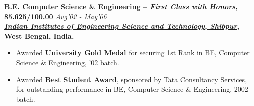 \documentclass[9pt]{article}
\newenvironment{changemargin}[2]{%
  \begin{list}{}{%
    \setlength{\topsep}{0pt}%
    \setlength{\leftmargin}{#1}%
    \setlength{\rightmargin}{#2}%
    \setlength{\listparindent}{\parindent}%
    \setlength{\itemindent}{\parindent}%
    \setlength{\parsep}{\parskip}%
  }%
  \item[]}{\end{list}
}
\newenvironment{body} {
	\vspace*{-16pt}
	\begin{changemargin}{-0.25in}{-0.5in}
  }	
	{\end{changemargin}
}
\begin{document}
\begin{body}
  \medskip
	\textbf{B.E. Computer Science \& Engineering -- \emph{First Class with Honors}, 85.625/100.00} \hfill \emph{Aug'02 - May'06} \\
	\textbf{\emph{\href{http://www.iiests.ac.in/}{Indian Institutes of Engineering Science and Technology, Shibpur}}, West Bengal, India.}\\
	\begin{itemize} \itemsep -0pt
		\item Awarded \textbf{University Gold Medal} for securing 1st Rank in BE, Computer Science \& Engineering, '02 batch.
		\item Awarded \textbf{Best Student Award}, sponsored by \href{http://www.tcs.com}{Tata Consultancy Services}, for outstanding performance in BE, Computer Science \& Engineering, 2002 batch.
	\end{itemize}
\end{body}

\smallskip
\end{document}
